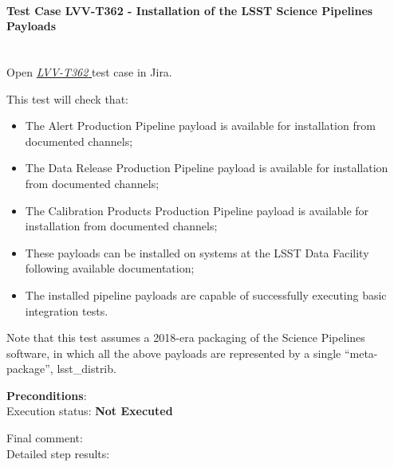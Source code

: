 \documentclass[DM,lsstdraft,STR,toc]{lsstdoc}
\providecommand{\tightlist}{
  \setlength{\itemsep}{0pt}\setlength{\parskip}{0pt}}
\begin{document}
    \paragraph{Test Case LVV-T362 - Installation of the LSST Science Pipelines Payloads
 }\mbox{}\\

Open  \href{https://jira.lsstcorp.org/secure/Tests.jspa#/testCase/LVV-T362}{\textit{ LVV-T362 } }
test case in Jira.

    This test will check that:

\begin{itemize}
\tightlist
\item
  The Alert Production Pipeline payload is available for installation
  from documented channels;
\item
  The Data Release Production Pipeline payload is available for
  installation from documented channels;
\item
  The Calibration Products Production Pipeline payload is available for
  installation from documented channels;
\item
  These payloads can be installed on systems at the LSST Data Facility
  following available documentation;
\item
  The installed pipeline payloads are capable of successfully executing
  basic integration tests.
\end{itemize}

Note that this test assumes a 2018-era packaging of the Science
Pipelines software, in which all the above payloads are represented by a
single ``meta-package'', lsst\_distrib.


    \textbf{ Preconditions}:\\
    

    Execution status: {\bf Not Executed }

    Final comment:\\


    Detailed step results:
\end{document}
